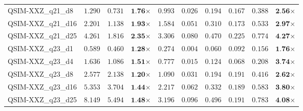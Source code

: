 \begin{table*}[t]
{\begin{tabular}{| l || r r c || r r r r r c |}
QSIM-XXZ\_q21\_d8 & $1.290$ & $0.731$ & $\textbf{1.76}$$\times$ & $0.993$ & $0.026$ & $0.194$ & $0.167$ & $0.388$ & $\textbf{2.56}$$\times$ \\
QSIM-XXZ\_q21\_d16 & $2.201$ & $1.138$ & $\textbf{1.93}$$\times$ & $1.584$ & $0.051$ & $0.310$ & $0.173$ & $0.533$ & $\textbf{2.97}$$\times$ \\
QSIM-XXZ\_q21\_d25 & $4.261$ & $1.816$ & $\textbf{2.35}$$\times$ & $3.306$ & $0.080$ & $0.470$ & $0.225$ & $0.774$ & $\textbf{4.27}$$\times$ \\
QSIM-XXZ\_q23\_d1 & $0.589$ & $0.460$ & $\textbf{1.28}$$\times$ & $0.274$ & $0.004$ & $0.060$ & $0.092$ & $0.156$ & $\textbf{1.76}$$\times$ \\
QSIM-XXZ\_q23\_d4 & $1.636$ & $1.086$ & $\textbf{1.51}$$\times$ & $0.777$ & $0.015$ & $0.124$ & $0.068$ & $0.208$ & $\textbf{3.74}$$\times$ \\
QSIM-XXZ\_q23\_d8 & $2.577$ & $2.138$ & $\textbf{1.20}$$\times$ & $1.090$ & $0.031$ & $0.194$ & $0.191$ & $0.416$ & $\textbf{2.62}$$\times$ \\
QSIM-XXZ\_q23\_d16 & $5.353$ & $3.704$ & $\textbf{1.44}$$\times$ & $2.217$ & $0.062$ & $0.332$ & $0.189$ & $0.583$ & $\textbf{3.80}$$\times$ \\
QSIM-XXZ\_q23\_d25 & $8.149$ & $5.494$ & $\textbf{1.48}$$\times$ & $3.196$ & $0.096$ & $0.496$ & $0.191$ & $0.783$ & $\textbf{4.08}$$\times$ \\
\hline
\end{tabular}
}
\end{table*}
